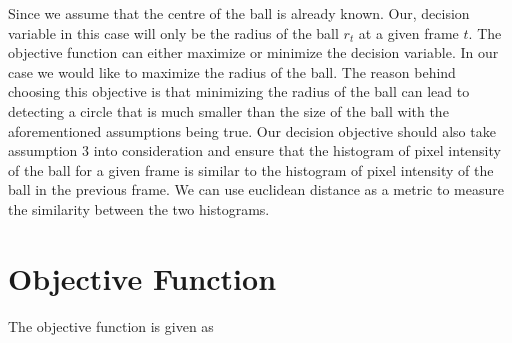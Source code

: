 \documentclass[12pt,a4paper]{article}
\begin{document}
Since we assume that the centre of the ball is already known. Our, decision variable in this case will only be the radius of the ball $r_t$ at a given frame $t$. The objective function can either maximize or minimize the decision variable. In our case we would like to maximize the radius of the ball. The reason behind choosing this objective is that minimizing the radius of the ball can lead to detecting a circle that is much smaller than the size of the ball with the aforementioned assumptions being true. Our decision objective should also take assumption 3 into consideration and ensure that the histogram of pixel intensity of the ball for a given frame is similar to the histogram of pixel intensity of the ball in the previous frame. We can use euclidean distance as a metric to measure the similarity between the two histograms.%




\section {Objective Function}
The objective function is given as 
\end{document}
